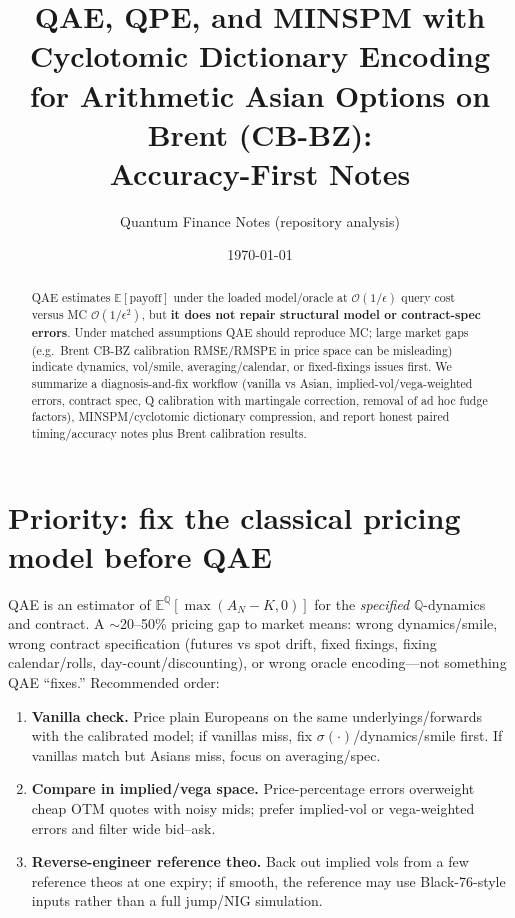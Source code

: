 \documentclass[11pt,a4paper]{article}
\title{QAE, QPE, and MINSPM with Cyclotomic Dictionary Encoding\\for Arithmetic Asian Options on Brent (CB-BZ):\\Accuracy-First Notes}
\author{Quantum Finance Notes (repository analysis)}
\date{\today}
\begin{document}
\maketitle

\begin{abstract}
QAE estimates $\mathbb{E}[\text{payoff}]$ under the loaded model/oracle at $\mathcal{O}(1/\epsilon)$ query cost versus MC $\mathcal{O}(1/\epsilon^2)$, but \textbf{it does not repair structural model or contract-spec errors}. Under matched assumptions QAE should reproduce MC; large market gaps (e.g.\ Brent CB-BZ calibration RMSE/RMSPE in price space can be misleading) indicate dynamics, vol/smile, averaging/calendar, or fixed-fixings issues first. We summarize a diagnosis-and-fix workflow (vanilla vs Asian, implied-vol/vega-weighted errors, contract spec, Q calibration with martingale correction, removal of ad hoc fudge factors), MINSPM/cyclotomic dictionary compression, and report honest paired timing/accuracy notes plus Brent calibration results.
\end{abstract}

\section{Priority: fix the classical pricing model before QAE}
QAE is an estimator of $\mathbb{E}^{\mathbb{Q}}[\max(A_N-K,0)]$ for the \emph{specified} $\mathbb{Q}$-dynamics and contract. A $\sim$20--50\% pricing gap to market means: wrong dynamics/smile, wrong contract specification (futures vs spot drift, fixed fixings, fixing calendar/rolls, day-count/discounting), or wrong oracle encoding---not something QAE ``fixes.'' Recommended order:
\begin{enumerate}
  \item \textbf{Vanilla check.} Price plain Europeans on the same underlyings/forwards with the calibrated model; if vanillas miss, fix $\sigma(\cdot)$/dynamics/smile first. If vanillas match but Asians miss, focus on averaging/spec.
  \item \textbf{Compare in implied/vega space.} Price-percentage errors overweight cheap OTM quotes with noisy mids; prefer implied-vol or vega-weighted errors and filter wide bid--ask.
  \item \textbf{Reverse-engineer reference theo.} Back out implied vols from a few reference theos at one expiry; if smooth, the reference may use Black-76-style inputs rather than a full jump/NIG simulation.
\end{enumerate}
\end{document}
